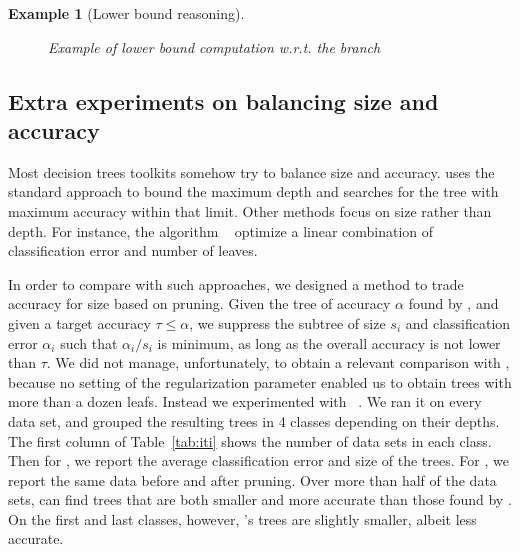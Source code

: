 \documentclass{article}
\newtheorem{example}{Example}
\begin{document}
\begin{example}[Lower bound reasoning]
\begin{figure}
\begin{center}
	\end{center}
	\caption{\label{fig:lowerbound} Example of lower bound computation w.r.t. the branch }
	\end{figure}

\end{example}


\subsection{Extra experiments on balancing size and accuracy}
\label{appendix:extra}

Most decision trees toolkits somehow try to balance size and accuracy. \blossom uses the standard approach to bound the maximum depth and searches for the tree with maximum accuracy within that limit. Other methods focus on size rather than depth. 
For instance, the algorithm \gosdt~\cite{NEURIPS2019_ac52c626} optimize a linear combination of classification error and number of leaves. 

In order to compare with such approaches, we designed a method to trade accuracy for size based on pruning. Given the tree of accuracy $\alpha$ found by \blossom, and given a target accuracy $\tau \leq \alpha$, we suppress the subtree of size $s_i$ and classification error $\alpha_i$ such that $\alpha_i/s_i$ is minimum, as long as the overall accuracy is not lower than $\tau$.  We did not manage, unfortunately, to obtain a relevant comparison with \gosdt, because no setting of the regularization parameter enabled us to obtain trees with more than a dozen leafs. Instead we experimented with \iti~\cite{Utgoff97decisiontree}. We ran it on every data set, and grouped the resulting trees in 4 classes depending on their depths. The first column of Table~\ref{tab:iti} shows the number of data sets in each class. Then for \iti, we report the average classification error and size of the trees.
For \blossom, we report the same data before and after pruning. 
Over more than half of the data sets, \blossom can find trees that are both smaller and more accurate than those found by \iti. On the first and last classes, however, \iti's trees are slightly smaller, albeit less accurate.
\end{document}
